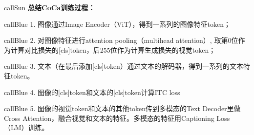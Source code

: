 \documentclass[zihao=false,fontset=windows]{ctexart}
\begin{document}
\begin{feishuhigh}{callSun}
\textcolor{feishuRed}{\textbf{总结CoCa训练过程：}}
\end{feishuhigh}
\begin{feishuhigh}{callBlue}
\textcolor{feishuBlue}{1.} 图像通过Image Encoder（ViT），得到一系列的图像特征token；
\end{feishuhigh}
\begin{feishuhigh}{callBlue}
\textcolor{feishuBlue}{2.} 对图像特征进行attention pooling（multihead attention）, 取第0位作为计算对比损失的[cls]token，后255位作为计算生成损失的视觉token；
\end{feishuhigh}
\begin{feishuhigh}{callBlue}
\textcolor{feishuBlue}{3.} 文本（在最后添加[cls]token）通过文本的解码器，得到一系列的文本特征token。
\end{feishuhigh}
\begin{feishuhigh}{callBlue}
\textcolor{feishuBlue}{4.} 图像的[cls]token和文本的[cls]token计算ITC loss
\end{feishuhigh}
\begin{feishuhigh}{callBlue}
\textcolor{feishuBlue}{5.} 图像的视觉token和文本的其他token传到多模态的Text Decoder里做Cross Attention，融合视觉和文本的特征。多模态的特征用Captioning Loss（LM）训练。
\end{feishuhigh}
\end{document}
